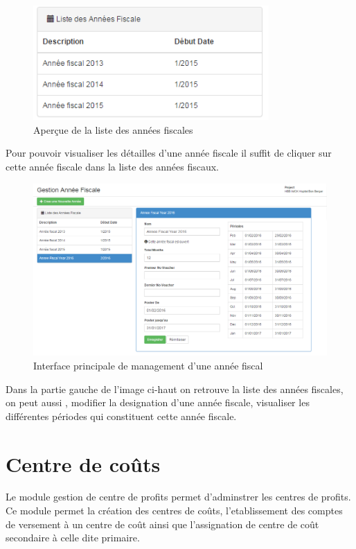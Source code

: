 \documentclass[12pt,a4paper]{report}
\begin{document}
\begin{figure}[h]
\begin{center}
\includegraphics[width=9cm]{pic/ListeAnnFisc.png}
\end{center}
\caption{Aperçue de la liste des années fiscales}
\label{Aperçue de la liste des années fiscaux}
\end{figure}

Pour pouvoir visualiser les détailles d'une année fiscale il suffit de cliquer sur cette année fiscale dans la liste des années fiscaux.

\begin{figure}[h]
\begin{center}
\includegraphics[width=12cm]{pic/FormAddFiscYear.png}
\end{center}
\caption{Interface principale de management d'une année fiscal}
\label{Interface principale de management d'une année fiscal}
\end{figure}

Dans la partie gauche de l'image ci-haut on retrouve la liste des années fiscales, on peut aussi , modifier la designation d'une année fiscale, visualiser les différentes périodes qui constituent cette année fiscale. 

\newpage
\section{Centre de coûts}
Le module gestion de centre de profits permet d'adminstrer les centres de profits. Ce module permet la création des centres de coûts, l'etablissement des comptes de versement à un centre de coût ainsi que l'assignation de centre de coût secondaire à celle dite primaire.
\end{document}
